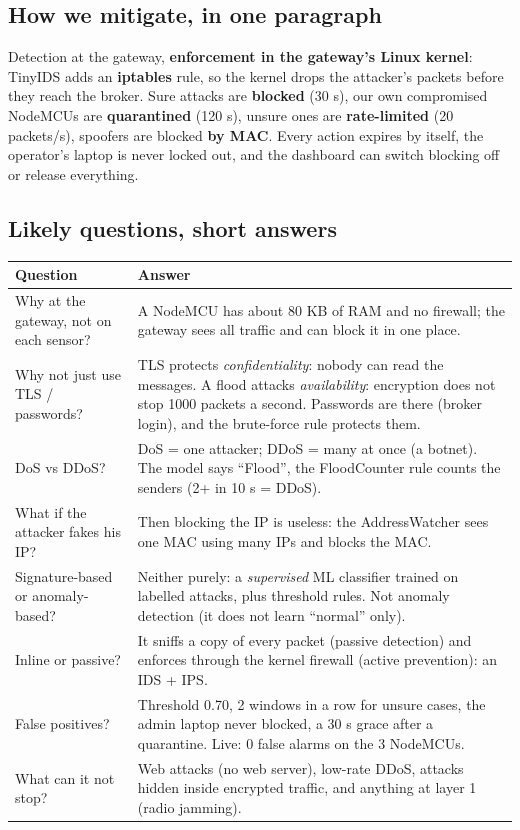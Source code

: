 \documentclass[11pt,a4paper]{article}
\begin{document}
\subsection{How we mitigate, in one paragraph}

Detection at the gateway, \textbf{enforcement in the gateway's Linux kernel}: TinyIDS adds an \textbf{iptables}
rule, so the kernel drops the attacker's packets before they reach the broker. Sure attacks are \textbf{blocked}
(30 s), our own compromised NodeMCUs are \textbf{quarantined} (120 s), unsure ones are \textbf{rate-limited}
(20 packets/s), spoofers are blocked \textbf{by MAC}. Every action expires by itself, the operator's laptop is never
locked out, and the dashboard can switch blocking off or release everything.

\subsection{Likely questions, short answers}

\begin{longtable}{P{5.2cm}P{9.8cm}}
\toprule
Question & Answer \\
\midrule
\endhead
Why at the gateway, not on each sensor? & A NodeMCU has about 80 KB of RAM and no firewall; the gateway sees all traffic
and can block it in one place. \\
Why not just use TLS / passwords? & TLS protects \emph{confidentiality}: nobody can read the messages. A flood
attacks \emph{availability}: encryption does not stop 1000 packets a second. Passwords are there (broker login), and
the brute-force rule protects them. \\
DoS vs DDoS? & DoS = one attacker; DDoS = many at once (a botnet). The model says ``Flood'', the FloodCounter rule
counts the senders (2+ in 10 s = DDoS). \\
What if the attacker fakes his IP? & Then blocking the IP is useless: the AddressWatcher sees one MAC using many IPs
and blocks the MAC. \\
Signature-based or anomaly-based? & Neither purely: a \emph{supervised} ML classifier trained on labelled attacks,
plus threshold rules. Not anomaly detection (it does not learn ``normal'' only). \\
Inline or passive? & It sniffs a copy of every packet (passive detection) and enforces through the kernel firewall
(active prevention): an IDS + IPS. \\
False positives? & Threshold 0.70, 2 windows in a row for unsure cases, the admin laptop never blocked, a 30 s grace
after a quarantine. Live: 0 false alarms on the 3 NodeMCUs. \\
What can it not stop? & Web attacks (no web server), low-rate DDoS, attacks hidden inside encrypted traffic, and
anything at layer 1 (radio jamming). \\
\bottomrule
\end{longtable}
\end{document}
